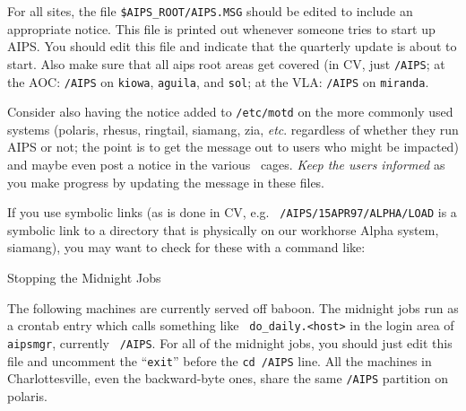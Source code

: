 \noindent For all sites, the file {\tt\$AIPS\_ROOT/AIPS.MSG} should be
edited to include an appropriate notice.  This file is printed out
whenever someone tries to start up AIPS.  You should edit this file and
indicate that the quarterly update is about to start.  Also make sure
that all aips root areas get covered (in CV, just {\tt /AIPS}; at the
AOC: {\tt /AIPS} on {\tt kiowa}, {\tt aguila}, and {\tt sol}; at the
VLA: {\tt /AIPS} on {\tt miranda}.

Consider also having the notice added to {\tt /etc/motd} on the more
commonly used systems (polaris, rhesus, ringtail, siamang, zia, {\it
etc\/}. regardless of whether they run AIPS or not; the point is to get
the message out to users who might be impacted) and maybe even post a
notice in the various \AIPS\ cages.  {\it Keep the users informed\/} as
you make progress by updating the message in these files.

If you use symbolic links (as is done in CV, e.g. {\tt
/AIPS/15APR97/ALPHA/LOAD} is a symbolic link to a directory that is
physically on our workhorse Alpha system, siamang), you may want to
check for these with a command like:\medskip

\medskip

\newsubsection Stopping the Midnight Jobs

The following machines are currently served off baboon.  The midnight
jobs run as a crontab entry which calls something like {\tt
do\_daily.<host>} in the login area of {\tt aipsmgr}, currently {\tt
/AIPS}.  For all of the midnight jobs, you should just edit this file
and uncomment the ``{\tt exit}'' before the {\tt cd /AIPS} line.  All
the machines in Charlottesville, even the backward-byte ones, share the
same {\tt /AIPS} partition on polaris.
\medskip

